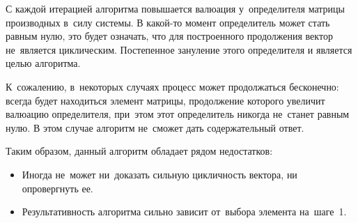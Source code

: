 С каждой итерацией алгоритма повышается валюация у~определителя матрицы производных в~силу системы.
В какой-то момент определитель может стать равным нулю, это будет означать,
что для построенного продолжения вектор не~является циклическим.
Постепенное зануление этого определителя и является целью алгоритма.

К~сожалению, в~некоторых случаях процесс может продолжаться бесконечно:
всегда будет находиться элемент матрицы, продолжение которого увеличит валюацию определителя,
при~этом этот определитель никогда не~станет равным нулю.
В этом случае алгоритм не~сможет дать содержательный ответ.

Таким образом, данный алгоритм обладает рядом недостатков:
\begin{itemize}
    \item
        Иногда не~может ни~доказать сильную цикличность вектора, ни опровергнуть ее.
    \item
        Результативность алгоритма сильно зависит от~выбора элемента на~шаге~1.
\end{itemize}
